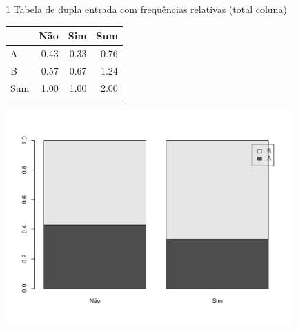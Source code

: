 \documentclass[
  ignorenonframetext,
  serif,
  professionalfont,
  usenames,
  dvipsnames,
  aspectratio = 169]{beamer}
\def\beginAThirdColumn{\begin{minipage}{0.31\textwidth}}%
\def\beginTwoThirdsColumn{\begin{minipage}{0.64\textwidth}}%
\def\endColumns{\end{minipage}}%
\begin{document}
\begin{frame}{1 Tabela de dupla entrada com frequências relativas (total
coluna)}
\label{tabela-de-dupla-entrada-com-frequuxeancias-relativas-total-coluna}
\beginAThirdColumn

\begin{longtable}[]{@{}lrrr@{}}
\toprule\noalign{}
& Não & Sim & Sum \\
\midrule\noalign{}
\endhead
A & 0.43 & 0.33 & 0.76 \\
B & 0.57 & 0.67 & 1.24 \\
Sum & 1.00 & 1.00 & 2.00 \\
\bottomrule\noalign{}
\end{longtable}

\endColumns
\beginTwoThirdsColumn

\begin{center}\includegraphics[width=11cm]{exercicios-encontro2-solucao_files/figure-beamer/unnamed-chunk-22-1} \end{center}

\endColumns
\end{frame}
\end{document}
